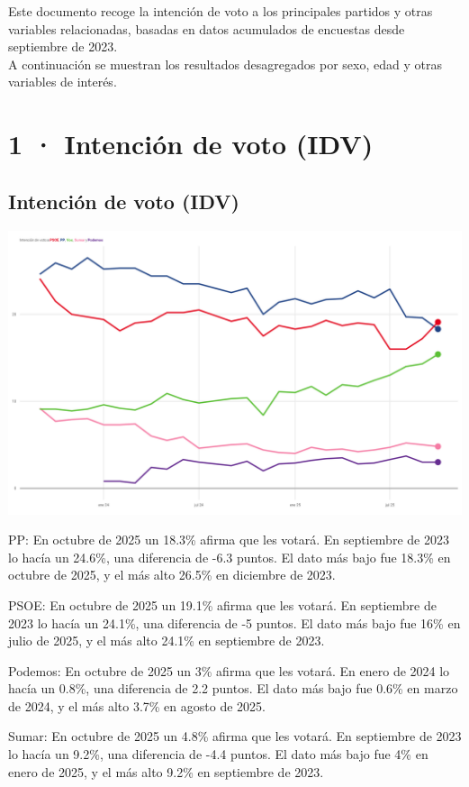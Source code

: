 \documentclass[
  letterpaper,
  DIV=11,
  numbers=noendperiod]{scrreprt}
\begin{document}
Este documento recoge la intención de voto a los principales partidos y
otras variables relacionadas, basadas en datos acumulados de encuestas
desde septiembre de 2023.\\
A continuación se muestran los resultados desagregados por sexo, edad y
otras variables de interés.

\part{1 · Intención de voto (IDV)}

\chapter{Intención de voto (IDV)}\label{intenciuxf3n-de-voto-idv-1}

\includegraphics[width=8in,height=\textheight,keepaspectratio]{figures/p_idv_static.png}

{PP}: En octubre de 2025 un 18.3\% afirma que les votará. En septiembre
de 2023 lo hacía un 24.6\%, una diferencia de -6.3 puntos. El dato más
bajo fue 18.3\% en octubre de 2025, y el más alto 26.5\% en diciembre de
2023.

{PSOE}: En octubre de 2025 un 19.1\% afirma que les votará. En
septiembre de 2023 lo hacía un 24.1\%, una diferencia de -5 puntos. El
dato más bajo fue 16\% en julio de 2025, y el más alto 24.1\% en
septiembre de 2023.

{Podemos}: En octubre de 2025 un 3\% afirma que les votará. En enero de
2024 lo hacía un 0.8\%, una diferencia de 2.2 puntos. El dato más bajo
fue 0.6\% en marzo de 2024, y el más alto 3.7\% en agosto de 2025.

{Sumar}: En octubre de 2025 un 4.8\% afirma que les votará. En
septiembre de 2023 lo hacía un 9.2\%, una diferencia de -4.4 puntos. El
dato más bajo fue 4\% en enero de 2025, y el más alto 9.2\% en
septiembre de 2023.
\end{document}
